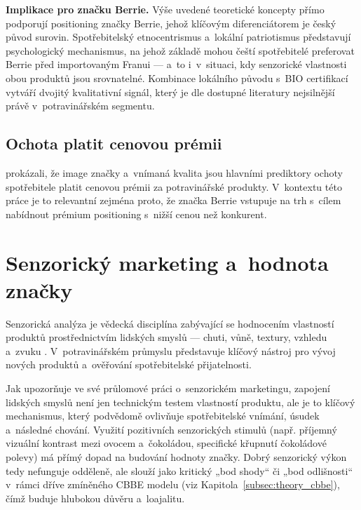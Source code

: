 \textbf{Implikace pro značku Berrie.} Výše uvedené teoretické koncepty přímo podporují positioning značky Berrie, jehož klíčovým diferenciátorem je český původ surovin. Spotřebitelský etnocentrismus a~lokální patriotismus představují psychologický mechanismus, na jehož základě mohou čeští spotřebitelé preferovat Berrie před importovaným Franui — a~to i~v~situaci, kdy senzorické vlastnosti obou produktů jsou srovnatelné. Kombinace lokálního původu s~BIO certifikací vytváří dvojitý kvalitativní signál, který je dle dostupné literatury nejsilnější právě v~potravinářském segmentu.

\subsection{Ochota platit cenovou prémii}

\textcite{anselmsson_2014} prokázali, že image značky a~vnímaná kvalita jsou hlavními prediktory ochoty spotřebitele platit cenovou prémii za potravinářské produkty. V~kontextu této práce je to relevantní zejména proto, že značka Berrie vstupuje na trh s~cílem nabídnout prémium positioning s~nižší cenou než konkurent.

\section{Senzorický marketing a~hodnota značky}
\label{sec:theory_sensory}

Senzorická analýza je vědecká disciplína zabývající se hodnocením vlastností produktů prostřednictvím lidských smyslů — chuti, vůně, textury, vzhledu a~zvuku \parencite{lawless_heymann_2010}. V~potravinářském průmyslu představuje klíčový nástroj pro vývoj nových produktů a~ověřování spotřebitelské přijatelnosti.

Jak upozorňuje \textcite{krishna_2012} ve své průlomové práci o~senzorickém marketingu, zapojení lidských smyslů není jen technickým testem vlastností produktu, ale je to klíčový mechanismus, který podvědomě ovlivňuje spotřebitelské vnímání, úsudek a~následné chování. Využití pozitivních senzorických stimulů (např. příjemný vizuální kontrast mezi ovocem a~čokoládou, specifické křupnutí čokoládové polevy) má přímý dopad na budování hodnoty značky. Dobrý senzorický výkon tedy nefunguje odděleně, ale slouží jako kritický „bod shody“ či „bod odlišnosti“ v~rámci dříve zmíněného CBBE modelu (viz Kapitola~\ref{subsec:theory_cbbe}), čímž buduje hlubokou důvěru a~loajalitu.

